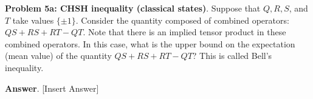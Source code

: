 \textbf{Problem 5a: CHSH inequality (classical states)}. Suppose that $Q, R, S$, and $T$ take values $\{\pm 1\}$. 
Consider the quantity composed of combined operators: $QS + RS + RT - QT$. 
Note that there is an implied tensor product in these combined operators.
In this case, what is the upper bound on the expectation (mean value) of the quantity $QS + RS + RT - QT$? 
This is called Bell's inequality.

\textbf{Answer}. [Insert Answer]


